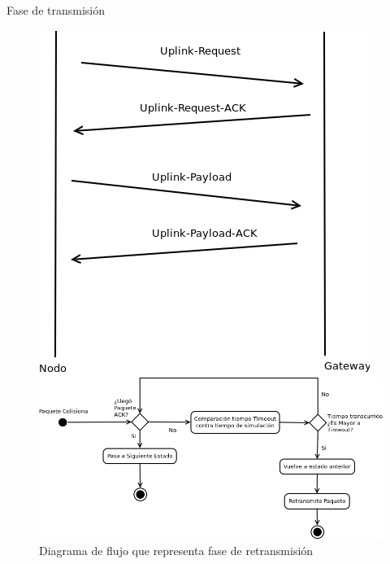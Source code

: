 \documentclass[10pt]{beamer}
\begin{document}
\begin{frame}[fragile]{Fase de transmisión}
\begin{figure}
\begin{overprint}
\centering\includegraphics[scale=0.37]{imagenes/transmit}\caption{Diagrama de flujo de mensajes en fase de transmisión}
\centering\includegraphics[scale=0.37]{imagenes/retrans}\caption{Diagrama de flujo que representa fase de retransmisión}
\end{overprint}
\end{figure}
\end{frame}
\end{document}
